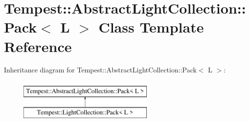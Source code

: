 \hypertarget{class_tempest_1_1_abstract_light_collection_1_1_pack}{\section{Tempest\+:\+:Abstract\+Light\+Collection\+:\+:Pack$<$ L $>$ Class Template Reference}
\label{class_tempest_1_1_abstract_light_collection_1_1_pack}
}
Inheritance diagram for Tempest\+:\+:Abstract\+Light\+Collection\+:\+:Pack$<$ L $>$\+:\begin{figure}[H]
\begin{center}
\leavevmode
\includegraphics[height=2.000000cm]{class_tempest_1_1_abstract_light_collection_1_1_pack}
\end{center}
\end{figure}
